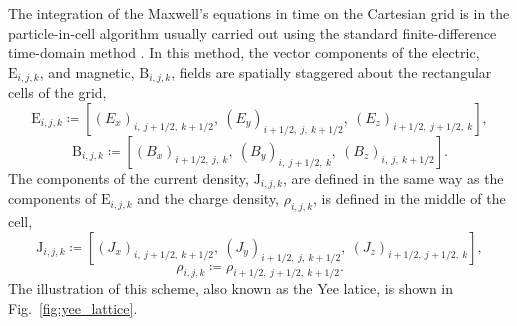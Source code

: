 \documentclass[10pt, a4paper, twoside, openright]{report}
\renewcommand{\vec}[1]{\boldsymbol{\mathrm{#1}}}
\begin{document}
The integration of the Maxwell's equations in time on the Cartesian grid is in the particle-in-cell algorithm usually carried out using the standard finite-difference time-domain method \cite{Yee1966}. In this method, the vector components of the electric, $ \vec{E}_{i, j, k} $, and magnetic, $ \vec{B}_{i, j, k} $, fields are spatially staggered about the rectangular cells of the grid,
\begin{equation}
	\label{eq:staggered_E}
	\vec{E}_{i, j, k} \coloneqq \left[\left(E_{x}\right)_{i,\: j + 1/2,\: k + 1/2}, \ \left(E_{y}\right)_{i + 1/2,\: j,\: k + 1/2}, \ \left(E_{z}\right)_{i + 1/2,\: j + 1/2,\: k} \right],
\end{equation}
\begin{equation}
	\label{eq:staggered_B}
	\vec{B}_{i, j, k} \coloneqq \left[\left(B_{x}\right)_{i + 1/2,\: j,\: k}, \ \left(B_{y}\right)_{i,\: j + 1/2,\: k}, \ \left(B_{z}\right)_{i,\: j,\: k + 1/2} \right].
\end{equation}
The components of the current density, $ \vec{J}_{i, j, k} $, are defined in the same way as the components of $ \vec{E}_{i, j, k} $ and the charge density, $ \rho_{i, j, k} $, is defined in the middle of the cell,
\begin{equation}\label{eq:staggered_J}
	\vec{J}_{i, j, k} \coloneqq \left[\left(J_{x}\right)_{i,\: j + 1/2,\: k + 1/2}, \ \left(J_{y}\right)_{i + 1/2,\: j,\: k + 1/2}, \ \left(J_{z}\right)_{i + 1/2,\: j + 1/2,\: k} \right],
\end{equation}
\begin{equation}\label{eq:staggered_rho}
	\rho_{i, j, k} \coloneqq \rho_{i + 1/2,\: j + 1/2,\: k + 1/2}.
\end{equation}
The illustration of this scheme, also known as the Yee latice, is shown in Fig.~\ref{fig:yee_lattice}. 
\end{document}
